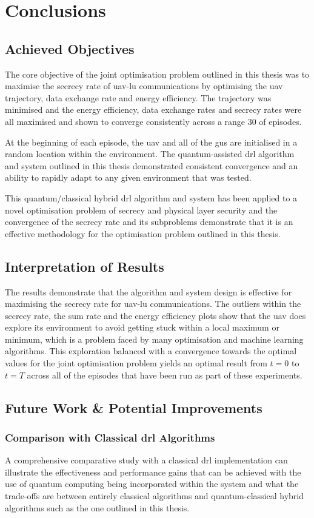 \chapter{Conclusions}
\section{Achieved Objectives}
The core objective of the joint optimisation problem outlined in this thesis was to maximise the secrecy rate of \acrshort{uav}-\acrshort{lu} communications by optimising the \acrshort{uav} trajectory, data exchange rate and energy efficiency. 
The trajectory was minimised and the energy efficiency, data exchange rates and secrecy rates were all maximised and shown to converge consistently across a range 30 of episodes.

At the beginning of each episode, the \acrshort{uav} and all of the \acrshort{gu}s are initialised in a random location within the environment. 
The quantum-assisted \acrshort{drl} algorithm and system outlined in this thesis demonstrated consistent convergence and an ability to rapidly adapt to any given environment that was tested. 

This quantum/classical hybrid \acrshort{drl} algorithm and system has been applied to a novel optimisation problem of secrecy and physical layer security and the convergence of the secrecy rate and its subproblems demonstrate that it is an effective methodology for the optimisation problem outlined in this thesis. 
\section{Interpretation of Results}
The results demonstrate that the algorithm and system design is effective for maximising the secrecy rate for \acrshort{uav}-\acrshort{lu} communications. The outliers within the secrecy rate, the sum rate and the energy efficiency plots show that the \acrshort{uav} does explore its environment to avoid getting stuck within a local maximum or minimum, which is a problem faced by many optimisation and machine learning algorithms. 
This exploration balanced with a convergence towards the optimal values for the joint optimisation problem yields an optimal result from $t=0$ to $t=T$ across all of the episodes that have been run as part of these experiments. 
\section{Future Work \& Potential Improvements}
\subsection{Comparison with Classical \texorpdfstring{\acrshort{drl}}{DRL} Algorithms}
A comprehensive comparative study with a classical \acrshort{drl} implementation can illustrate the effectiveness and performance gains that can be achieved with the use of quantum computing being incorporated within the system and what the trade-offs are between entirely classical algorithms and quantum-classical hybrid algorithms such as the one outlined in this thesis. 

